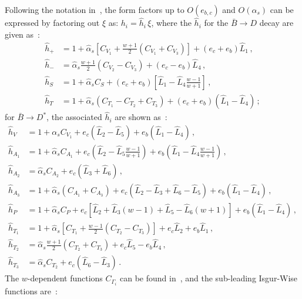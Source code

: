 \documentclass[prd,preprint,superscriptaddress,amsmath,amssymb]{revtex4}
\begin{document}
 Following the notation in~\cite{Bernlochner:2017jka}, the form factors up to $O(e_{b,c})$ and $O(\alpha_s)$ can  be expressed by factoring out $\xi$ as: $ h_{i} = \hat h_{i}\, \xi$, where the $\hat h_i$ for the $\bar B \to D$ decay  are given as~\cite{Bernlochner:2017jka}: 
 \begin{subequations}
 \begin{align}
 \hat h_+ & = 1 + \hat\alpha_s \left[ C_{V_1} + \frac{w + 1}{2} (C_{V_1} + C_{V_3} )\right] + ( e_c + e_b) \hat L_1\,,  \\
 \hat h_{-} & = \hat\alpha_s \frac{w + 1}{2} (C_{V_2} - C_{V_3} ) + ( e_c - e_b) \hat L_4\,, \\
 \hat h_S & = 1 + \hat\alpha_s C_S + ( e_c + e_b) \left[ \hat L_1 - \hat L_4 \frac{w-1}{w+1} \right]\,, \\
 \hat h_T &= 1+ \hat\alpha_s (C_{T_1} - C_{T_2} + C_{T_3}) + (e_c + e_b) (\hat L_1 - \hat L_4)\,;
 \end{align}
 \end{subequations}
 for $\bar B \to D^*$, the associated $\hat h_{i}$ are shown as~\cite{Bernlochner:2017jka}:
  \begin{subequations}
  \begin{align}
  \hat h_V & = 1 + \alpha_s C_{V_1} + e_c (\hat L_2 -\hat L_5) + e_b (\hat L_1 -\hat L_4)\,, \\
   \hat h_{A_1} & = 1 + \hat \alpha_s C_{A_1} + e_c  \left(\hat L_2 - \hat L_5 \frac{w-1}{w+1} \right) + e_b \left(\hat L_1 - \hat L_4 \frac{w-1}{w+1} \right)\,, \\
  \hat h_{A_2} & = \hat \alpha_s C_{A_2} + e_c (\hat L_3 + \hat L_6)\,, \\
  \hat h_{A_3} &= 1+ \hat \alpha_s (C_{A_1}+C_{A_3}) + e_c (\hat L_2 - \hat L_3 + \hat L_6 - \hat L_5) + e_b (\hat L_1 - \hat L_4)\,, \\
  \hat h_P &= 1+ \hat \alpha_s C_P + e_c \left[ \hat L_2 + \hat L_3 (w-1) + \hat L_5 - \hat L_6 (w+1) \right] + e_b (\hat L_1 - \hat L_4)\,, \\
  \hat h_{T_1} &= 1 + \hat \alpha_s \left[ C_{T_1} + \frac{w-1}{2} (C_{T_2} - C_{T_3}) \right] + e_c \hat L_2 + e_b \hat L_1\,,\\
  \hat h_{T_2} &= \hat \alpha_s \frac{w+1}{2} (C_{T_2}+ C_{T_3}) + e_c \hat L_5 - e_b \hat L_4\,,\\
  \hat h_{T_3} &= \hat \alpha_s C_{T_2} + e_c (\hat L_6 - \hat L_3)\,.
  \end{align}  
  \end{subequations}
  The $w$-dependent functions $C_{\Gamma_i}$ can be found in~\cite{Neubert:1992qq,Bernlochner:2017jka}, and the sub-leading Isgur-Wise functions are~\cite{Falk:1992wt}:
\end{document}
